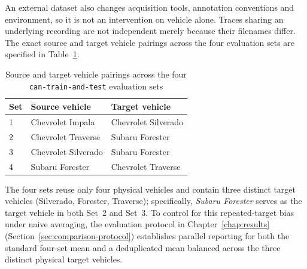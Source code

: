 \documentclass[12pt, a4paper, reqno, oneside]{book}
\begin{document}
An external dataset also changes acquisition tools, annotation conventions and environment, so it is not an intervention on vehicle alone. Traces sharing an underlying recording are not independent merely because their filenames differ. The exact source and target vehicle pairings across the four evaluation sets are specified in Table~\ref{tab:vehicle_pairs}.

\begin{table}[htbp]\centering\footnotesize
\caption[Source and target vehicle pairings across the four sets]{Source and target vehicle pairings across the four \texttt{can-train-and-test} evaluation sets}\label{tab:vehicle_pairs}
\begin{tabular}{lll}\toprule Set & Source vehicle & Target vehicle\\\midrule
1 & Chevrolet Impala & Chevrolet Silverado\\
2 & Chevrolet Traverse & Subaru Forester\\
3 & Chevrolet Silverado & Subaru Forester\\
4 & Subaru Forester & Chevrolet Traverse\\\bottomrule\end{tabular}
\end{table}

The four sets reuse only four physical vehicles and contain three distinct target vehicles (Silverado, Forester, Traverse); specifically, \textit{Subaru Forester} serves as the target vehicle in both Set~2 and Set~3. To control for this repeated-target bias under naive averaging, the evaluation protocol in Chapter~\ref{chap:results} (Section~\ref{sec:comparison-protocol}) establishes parallel reporting for both the standard four-set mean and a deduplicated mean balanced across the three distinct physical target vehicles.
\end{document}
